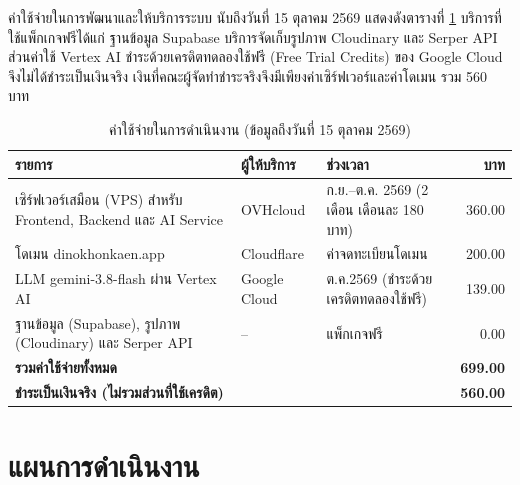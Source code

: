 ค่าใช้จ่ายในการพัฒนาและให้บริการระบบ นับถึงวันที่ 15 ตุลาคม 2569 แสดงดังตารางที่ \ref{tab:cost} บริการที่ใช้แพ็กเกจฟรีได้แก่ ฐานข้อมูล Supabase บริการจัดเก็บรูปภาพ Cloudinary และ Serper API ส่วนค่าใช้ Vertex AI ชำระด้วยเครดิตทดลองใช้ฟรี (Free Trial Credits) ของ Google Cloud จึงไม่ได้ชำระเป็นเงินจริง เงินที่คณะผู้จัดทำชำระจริงจึงมีเพียงค่าเซิร์ฟเวอร์และค่าโดเมน รวม 560 บาท

\begin{table}[H]
\centering
\caption{ค่าใช้จ่ายในการดำเนินงาน (ข้อมูลถึงวันที่ 15 ตุลาคม 2569)}
\label{tab:cost}
\begin{tabular}{|p{4.6cm}|p{2.4cm}|p{4.2cm}|r|}
\hline
\textbf{รายการ} & \textbf{ผู้ให้บริการ} & \textbf{ช่วงเวลา} & \textbf{บาท} \\
\hline
เซิร์ฟเวอร์เสมือน (VPS) สำหรับ Frontend, Backend และ AI Service & OVHcloud & ก.ย.--ต.ค. 2569 (2 เดือน เดือนละ 180 บาท) & 360.00 \\ \hline
โดเมน dinokhonkaen.app & Cloudflare & ค่าจดทะเบียนโดเมน & 200.00 \\ \hline
LLM gemini-3.8-flash ผ่าน Vertex AI & Google Cloud & ต.ค.2569 (ชำระด้วยเครดิตทดลองใช้ฟรี) & 139.00 \\ \hline
ฐานข้อมูล (Supabase), รูปภาพ (Cloudinary) และ Serper API & -- & แพ็กเกจฟรี & 0.00 \\ \hline
\multicolumn{3}{|l|}{\textbf{รวมค่าใช้จ่ายทั้งหมด}} & \textbf{699.00} \\ \hline
\multicolumn{3}{|l|}{\textbf{ชำระเป็นเงินจริง (ไม่รวมส่วนที่ใช้เครดิต)}} & \textbf{560.00} \\ \hline
\end{tabular}
\end{table}

\section{แผนการดำเนินงาน}

